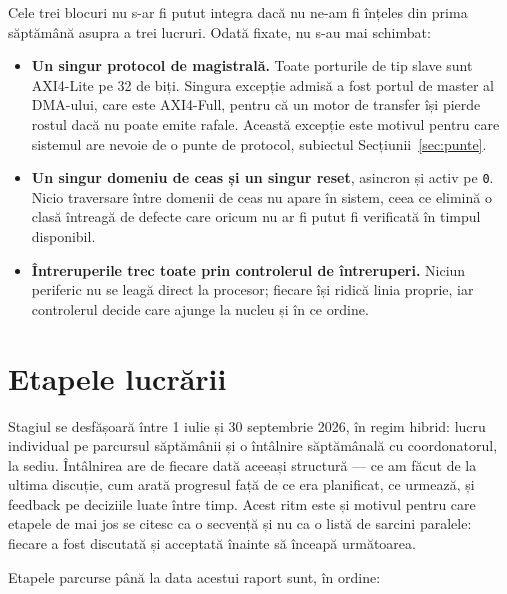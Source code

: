 \documentclass[11pt,openany]{report}
\begin{document}
Cele trei blocuri nu s-ar fi putut integra dacă nu ne-am fi înțeles din prima
săptămână asupra a trei lucruri. Odată fixate, nu s-au mai schimbat:

\begin{itemize}[itemsep=4pt,topsep=3pt]
\item \textbf{Un singur protocol de magistrală.} Toate porturile de tip slave
      sunt AXI4-Lite pe 32 de biți. Singura excepție admisă a fost portul de
      master al DMA-ului, care este AXI4-Full, pentru că un motor de transfer
      își pierde rostul dacă nu poate emite rafale. Această excepție este
      motivul pentru care sistemul are nevoie de o punte de protocol, subiectul
      Secțiunii~\ref{sec:punte}.
\item \textbf{Un singur domeniu de ceas și un singur reset}, asincron și activ
      pe \texttt{0}. Nicio traversare între domenii de ceas nu apare în sistem,
      ceea ce elimină o clasă întreagă de defecte care oricum nu ar fi putut fi
      verificată în timpul disponibil.
\item \textbf{Întreruperile trec toate prin controlerul de întreruperi.} Niciun
      periferic nu se leagă direct la procesor; fiecare își ridică linia
      proprie, iar controlerul decide care ajunge la nucleu și în ce ordine.
\end{itemize}

\section{Etapele lucrării}

Stagiul se desfășoară între 1 iulie și 30 septembrie 2026, în regim hibrid: lucru
individual pe parcursul săptămânii și o întâlnire săptămânală cu coordonatorul,
la sediu. Întâlnirea are de fiecare dată aceeași structură --- ce am făcut de la
ultima discuție, cum arată progresul față de ce era planificat, ce urmează, și
feedback pe deciziile luate între timp. Acest ritm este și motivul pentru care
etapele de mai jos se citesc ca o secvență și nu ca o listă de sarcini paralele:
fiecare a fost discutată și acceptată înainte să înceapă următoarea.

Etapele parcurse până la data acestui raport sunt, în ordine:
\end{document}
